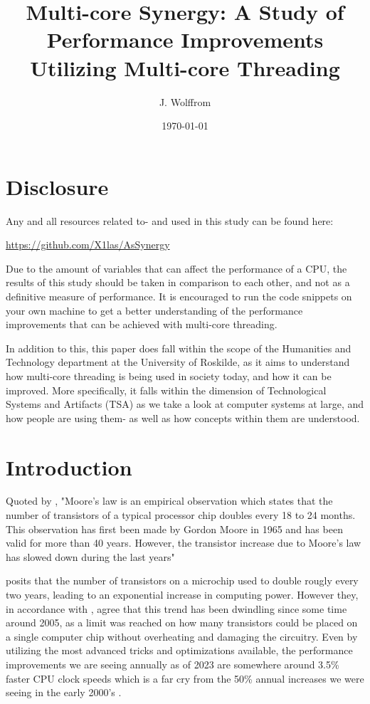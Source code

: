 \documentclass[12pt,a4paper]{article}
\title{Multi-core Synergy: A Study of Performance Improvements Utilizing Multi-core Threading}
\author{J. Wolffrom}
\date{\today}
\begin{document}
\maketitle
\newpage

\begin{abstract}

\end{abstract}
\newpage

\tableofcontents
\newpage

\section{Disclosure}

Any and all resources related to- and used in this study can be found here:

\href{https://github.com/X1las/AsSynergy}{https://github.com/X1las/AsSynergy}

Due to the amount of variables that can affect the performance of a CPU, the results of this study should be taken in comparison to each other, and not as a definitive measure of performance. It is encouraged to run the code snippets on your own machine to get a better understanding of the performance improvements that can be achieved with multi-core threading.

In addition to this, this paper does fall within the scope of the Humanities and Technology department at the University of Roskilde, as it aims to understand how multi-core threading is being used in society today, and how it can be improved. More specifically, it falls within the dimension of Technological Systems and Artifacts (TSA) as we take a look at computer systems at large, and how people are using them- as well as how concepts within them are understood.

\section{Introduction}

Quoted by \cite{Rauber2023}, "Moore’s law is an empirical
observation which states that the number of transistors of a typical processor chip
doubles every 18 to 24 months. This observation has first been made by Gordon
Moore in 1965 and has been valid for more than 40 years. However, the transistor
increase due to Moore’s law has slowed down during the last years" 

\citeauthor{Rauber2023} posits that the number of transistors on a microchip used to double rougly every two years, leading to an exponential increase in computing power. However they, in accordance with \cite{Mattson2014}, agree that this trend has been dwindling since some time around 2005, as a limit was reached on how many transistors could be placed on a single computer chip without overheating and damaging the circuitry. Even by utilizing the most advanced tricks and optimizations available, the performance improvements we are seeing annually as of 2023 are somewhere around 3.5\% faster CPU clock speeds \parencite[p. 11]{Rauber2023} which is a far cry from the 50\% annual increases we were seeing in the early 2000's \parencite[p. 11]{Rauber2023}. 
\end{document}
